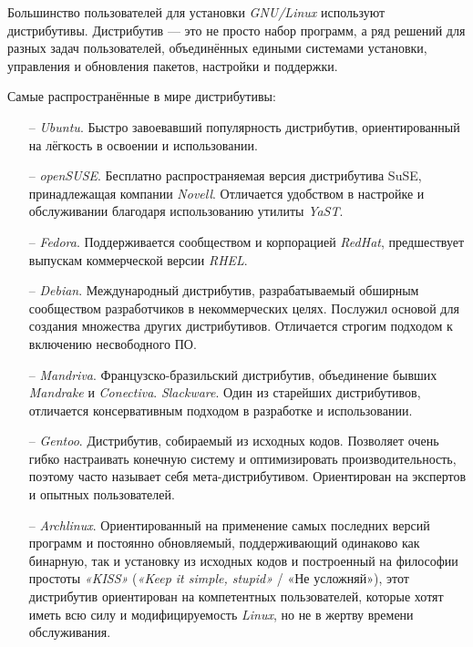 Большинство пользователей для установки \textit{GNU/Linux} используют дистрибутивы. Дистрибутив — это не просто набор программ, а ряд решений для разных задач пользователей, объединённых едиными системами установки, управления и обновления пакетов, настройки и поддержки.~\cite{linuxOffDoc}

Самые распространённые в мире дистрибутивы:
\begin{itemize}

\item[--] \textit{Ubuntu}. Быстро завоевавший популярность дистрибутив, ориентированный на лёгкость в освоении и использовании.

\item[--] \textit{openSUSE}. Бесплатно распространяемая версия дистрибутива SuSE, принадлежащая компании \textit{Novell}. Отличается удобством в настройке и обслуживании благодаря использованию утилиты \textit{YaST}.
\item[--] \textit{Fedora}. Поддерживается сообществом и корпорацией \textit{RedHat}, предшествует выпускам коммерческой версии \textit{RHEL}.

\item[--] \textit{Debian}. Международный дистрибутив, разрабатываемый обширным сообществом разработчиков в некоммерческих целях. Послужил основой для создания множества других дистрибутивов. Отличается строгим подходом к включению несвободного ПО.
\item[--] \textit{Mandriva}. Французско-бразильский дистрибутив, объединение бывших \textit{Mandrake} и \textit{Conectiva}.
\textit{Slackware}. Один из старейших дистрибутивов, отличается консервативным подходом в разработке и использовании.

\item[--] \textit{Gentoo}. Дистрибутив, собираемый из исходных кодов. Позволяет очень гибко настраивать конечную систему и оптимизировать производительность, поэтому часто называет себя мета-дистрибутивом. Ориентирован на экспертов и опытных пользователей.

\item[--] \textit{Archlinux}. Ориентированный на применение самых последних версий программ и постоянно обновляемый, поддерживающий одинаково как бинарную, так и установку из исходных кодов и построенный на философии простоты \textit{«KISS»} (\textit{«Keep it simple, stupid»} / «Не усложняй»), этот дистрибутив ориентирован на компетентных пользователей, которые хотят иметь всю силу и модифицируемость \textit{Linux}, но не в жертву времени обслуживания.
\end{itemize}


